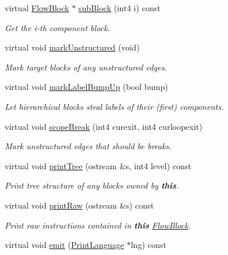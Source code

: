 \begin{DoxyCompactItemize}
virtual \mbox{\hyperlink{class_flow_block}{Flow\+Block}} $\ast$ \mbox{\hyperlink{class_block_graph_a57ca5980b8c1ba97c468f82888bf0033}{sub\+Block}} (int4 i) const
\begin{DoxyCompactList}\small\item\em Get the i-\/th component block. \end{DoxyCompactList}\item 
virtual void \mbox{\hyperlink{class_block_graph_a6047a66449b05bf62b33a2bef8642033}{mark\+Unstructured}} (void)
\begin{DoxyCompactList}\small\item\em Mark target blocks of any unstructured edges. \end{DoxyCompactList}\item 
virtual void \mbox{\hyperlink{class_block_graph_a67e2a75a80e60655a9936045d40983f6}{mark\+Label\+Bump\+Up}} (bool bump)
\begin{DoxyCompactList}\small\item\em Let hierarchical blocks steal labels of their (first) components. \end{DoxyCompactList}\item 
virtual void \mbox{\hyperlink{class_block_graph_a55618dfd49266bd4185d119f08e8b630}{scope\+Break}} (int4 curexit, int4 curloopexit)
\begin{DoxyCompactList}\small\item\em Mark unstructured edges that should be {\itshape breaks}. \end{DoxyCompactList}\item 
virtual void \mbox{\hyperlink{class_block_graph_add1908219c53b2687c4d1c6c9132c11e}{print\+Tree}} (ostream \&s, int4 level) const
\begin{DoxyCompactList}\small\item\em Print tree structure of any blocks owned by {\bfseries{this}}. \end{DoxyCompactList}\item 
virtual void \mbox{\hyperlink{class_block_graph_abcae771fc675bcc52c78b2f1dc0ab98a}{print\+Raw}} (ostream \&s) const
\begin{DoxyCompactList}\small\item\em Print raw instructions contained in {\bfseries{this}} \mbox{\hyperlink{class_flow_block}{Flow\+Block}}. \end{DoxyCompactList}\item 
virtual void \mbox{\hyperlink{class_block_graph_a535d3c7cb13e5e45b6e121b024fa339f}{emit}} (\mbox{\hyperlink{class_print_language}{Print\+Language}} $\ast$lng) const

\end{DoxyCompactItemize}
